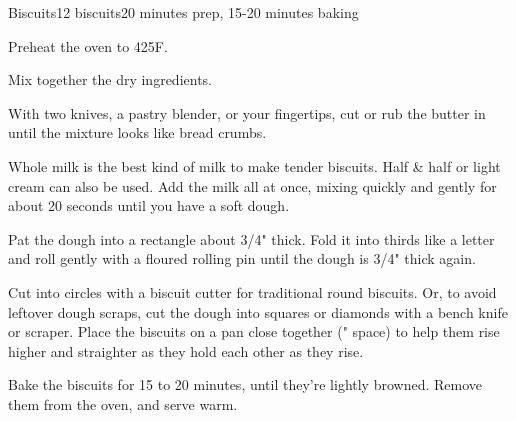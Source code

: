 \documentclass[../Cookbook.tex]{subfiles}
\begin{document}
\begin{recipe}[Biscuits]{Biscuits}{12 biscuits}{20 minutes prep, 15-20 minutes baking}

Preheat the oven to 425\0F.


Mix together the dry ingredients.

With two knives, a pastry blender, or your fingertips, cut or rub the butter in until the mixture looks like bread crumbs.

Whole milk is the best kind of milk to make tender biscuits. Half \& half or light cream can also be used.
Add the milk all at once, mixing quickly and gently for about 20 seconds until you have a soft dough.

Pat the dough into a rectangle about 3/4" thick. Fold it into thirds like a letter and roll gently with a floured rolling pin until the dough is 3/4" thick again.

Cut into circles with a biscuit cutter for traditional round biscuits. Or, to avoid leftover dough scraps, cut the dough into squares or diamonds with a bench knife or scraper.
Place the biscuits on a pan close together (" space) to help them rise higher and straighter as they hold each other as they rise.

Bake the biscuits for 15 to 20 minutes, until they're lightly browned. Remove them from the oven, and serve warm.


\end{recipe}
\end{document}
